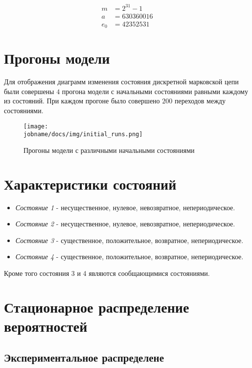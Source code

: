 \begin{align*}
    m & = 2^{31} - 1 \\
    a & = 630360016 \\
    e_0 & = 42352531
\end{align*}

\section*{Прогоны модели}

Для отображения диаграмм изменения состояния дискретной марковской цепи были совершены $4$ прогона модели
с начальными состояниями равными каждому из состояний. При каждом прогоне было совершено $200$ переходов между
состояниями.

\begin{figure}[h!]
    \centering
        \texttt{[image: \\jobname/docs/img/initial\_runs.png]}
    \caption{Прогоны модели с различными начальными состояниями}
\end{figure}

\section*{Характеристики состояний}

\begin{itemize}
    \item \textit{Состояние 1} - несущественное, нулевое, невозвратное, непериодическое.
    \item \textit{Состояние 2} - несущественное, нулевое, невозвратное, непериодическое.
    \item \textit{Состояние 3} - существенное, положительное, возвратное, непериодическое.
    \item \textit{Состояние 4} - существенное, положительное, возвратное, непериодическое.
\end{itemize}

Кроме того состояния 3 и 4 являются сообщающимися состояниями.

\section*{Стационарное распределение вероятностей}

\subsection*{Экспериментальное распределене}

